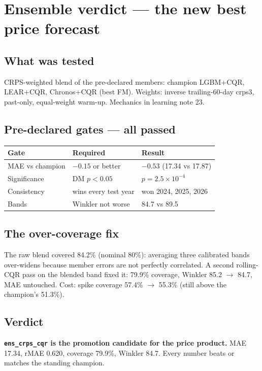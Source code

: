 \section{Ensemble verdict --- the new best price forecast}

\subsection{What was tested}

CRPS-weighted blend of the pre-declared members: champion LGBM+CQR,
LEAR+CQR, Chronos+CQR (best FM). Weights: inverse trailing-60-day
crps3, past-only, equal-weight warm-up. Mechanics in learning
note 23.

\subsection{Pre-declared gates --- all passed}

\begin{tabular}{lll}
\hline
Gate & Required & Result \\
\hline
MAE vs champion & $-0.15$ or better & $-0.53$ (17.34 vs 17.87) \\
Significance & DM $p < 0.05$ & $p = 2.5\times10^{-4}$ \\
Consistency & wins every test year & won 2024, 2025, 2026 \\
Bands & Winkler not worse & 84.7 vs 89.5 \\
\hline
\end{tabular}

\subsection{The over-coverage fix}

The raw blend covered 84.2\% (nominal 80\%): averaging three
calibrated bands over-widens because member errors are not
perfectly correlated. A second rolling-CQR pass on the blended band
fixed it: 79.9\% coverage, Winkler 85.2 $\rightarrow$ 84.7, MAE
untouched. Cost: spike coverage 57.4\% $\rightarrow$ 55.3\%
(still above the champion's 51.3\%).

\subsection{Verdict}

\textbf{\texttt{ens\_crps\_cqr} is the promotion candidate for the
price product.} MAE 17.34, rMAE 0.620, coverage 79.9\%,
Winkler 84.7. Every number beats or matches the standing champion.

